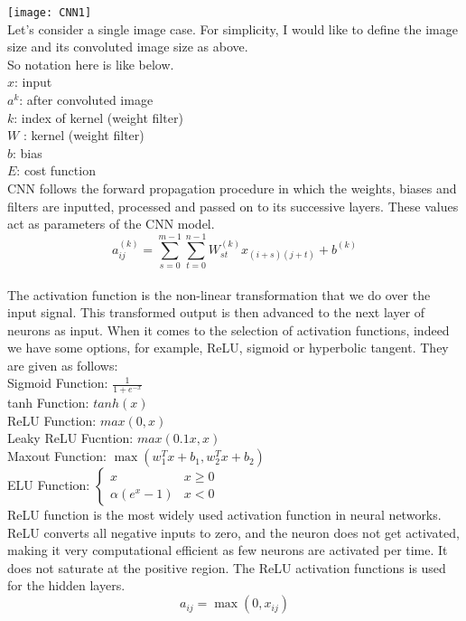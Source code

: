 \documentclass[12pt]{revtex4}
\begin{document}
\texttt{[image: CNN1]}
\\Let's consider a single image case. For simplicity, I would like to define the image size and its convoluted image
size as above.
\\So notation here is like below.
\\$x$: input
\\$a^{k}$: after convoluted image
\\$k$: index of kernel (weight filter)
\\$W$ : kernel (weight filter)
\\$b$: bias
\\$E$: cost function
\\CNN follows the forward propagation procedure in which the weights, biases and filters are inputted, processed and passed on to its successive layers. These values act as parameters of the CNN model. 
\begin{equation}a_{i j}^{(k)}=\sum_{s=0}^{m-1} \sum_{t=0}^{n-1} W_{s t}^{(k)} x_{(i+s)(j+t)}+b^{(k)}\end{equation}
\\The activation function is the non-linear transformation that we do over the input signal. This transformed output is then advanced to the next layer of neurons as input. When it comes to the selection of activation functions, indeed we have some options, for example, ReLU, sigmoid or hyperbolic tangent. They are given as follows: 
\\Sigmoid Function: $\frac{1}{1+e^{-x}}$
\\tanh Function: $tanh (x)$
\\ReLU Function: $max (0, x)$
\\Leaky ReLU Fucntion: $max(0.1x,x)$
\\Maxout Function: $\max \left(w_{1}^{T} x+b_{1}, w_{2}^{T} x+b_{2}\right)$
\\ELU Function: $\left\{\begin{array}{ll}
x & x \geq 0 \\
\alpha\left(e^{x}-1\right) & x<0
\end{array}\right.$
\\ReLU function is the most widely used activation function in neural networks. ReLU converts all negative inputs to zero, and the neuron does not get activated, making it very computational efficient as few neurons are activated per time. It does not saturate at the positive region. The ReLU activation functions is used for the hidden layers.
\begin{equation}a_{i j}=\max \left(0, x_{i j}\right)\end{equation}
\end{document}
